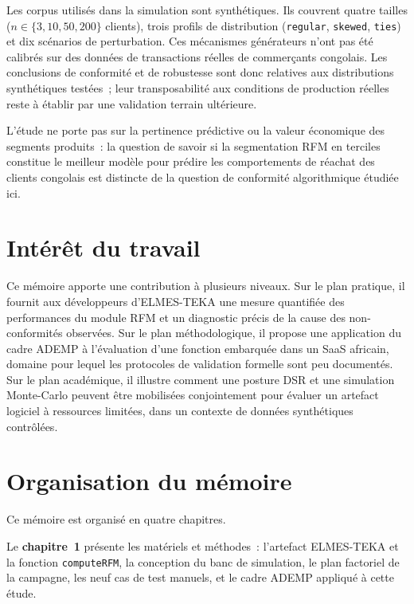Les corpus utilisés dans la simulation sont synthétiques. Ils couvrent quatre tailles
($n \in \{3, 10, 50, 200\}$ clients), trois profils de distribution (\texttt{regular},
\texttt{skewed}, \texttt{ties}) et dix scénarios de perturbation. Ces mécanismes générateurs
n'ont pas été calibrés sur des données de transactions réelles de commerçants congolais. Les
conclusions de conformité et de robustesse sont donc relatives aux distributions synthétiques
testées~; leur transposabilité aux conditions de production réelles reste à établir par une
validation terrain ultérieure.

L'étude ne porte pas sur la pertinence prédictive ou la valeur économique des segments
produits~: la question de savoir si la segmentation RFM en terciles constitue le meilleur
modèle pour prédire les comportements de réachat des clients congolais \citep{Fader2005} est
distincte de la question de conformité algorithmique étudiée ici.

\section*{Intérêt du travail}

Ce mémoire apporte une contribution à plusieurs niveaux. Sur le plan pratique, il fournit
aux développeurs d'ELMES-TEKA une mesure quantifiée des performances du module RFM et un
diagnostic précis de la cause des non-conformités observées. Sur le plan méthodologique, il
propose une application du cadre ADEMP à l'évaluation d'une fonction embarquée dans un SaaS
africain, domaine pour lequel les protocoles de validation formelle sont peu documentés.
Sur le plan académique, il illustre comment une posture DSR et une simulation Monte-Carlo
peuvent être mobilisées conjointement pour évaluer un artefact logiciel à ressources
limitées, dans un contexte de données synthétiques contrôlées.

\section*{Organisation du mémoire}

Ce mémoire est organisé en quatre chapitres.

\medskip

Le \textbf{chapitre~1} présente les matériels et méthodes~: l'artefact ELMES-TEKA et la
fonction \texttt{computeRFM}, la conception du banc de simulation, le plan factoriel de la
campagne, les neuf cas de test manuels, et le cadre ADEMP appliqué à cette étude.

